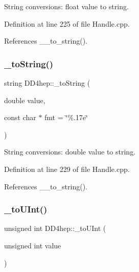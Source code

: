 String conversions\+: float value to string. 



Definition at line 225 of file Handle.\+cpp.



References \+\_\+\+\_\+to\+\_\+string().

\hypertarget{group___d_d4_h_e_p___g_e_o_m_e_t_r_y_ga4e976c2563bd851ad9569c4a9c28d73a}{}\label{group___d_d4_h_e_p___g_e_o_m_e_t_r_y_ga4e976c2563bd851ad9569c4a9c28d73a} 
\subsubsection{\texorpdfstring{\+\_\+to\+String()}{\_toString()}\hspace{0.1cm}{\footnotesize\ttfamily [5/5]}}
{\footnotesize\ttfamily string D\+D4hep\+::\+\_\+to\+String (\begin{DoxyParamCaption}\item[{double}]{value,  }\item[{const char $\ast$}]{fmt = {\ttfamily \char`\"{}\%.17e\char`\"{}} }\end{DoxyParamCaption})}



String conversions\+: double value to string. 



Definition at line 229 of file Handle.\+cpp.



References \+\_\+\+\_\+to\+\_\+string().

\hypertarget{group___d_d4_h_e_p___g_e_o_m_e_t_r_y_gab71d50eed88236ff6d21b5a29c7bba70}{}\label{group___d_d4_h_e_p___g_e_o_m_e_t_r_y_gab71d50eed88236ff6d21b5a29c7bba70} 
\subsubsection{\texorpdfstring{\+\_\+to\+U\+Int()}{\_toUInt()}}
{\footnotesize\ttfamily unsigned int D\+D4hep\+::\+\_\+to\+U\+Int (\begin{DoxyParamCaption}\item[{unsigned int}]{value }\end{DoxyParamCaption})\hspace{0.3cm}{\ttfamily [inline]}}



